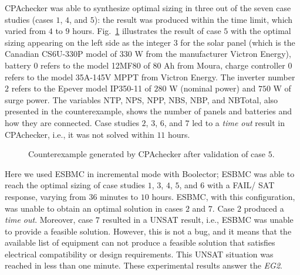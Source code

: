 \documentclass[runningheads]{llncs}
\begin{document}
CPAchecker was able to synthesize optimal sizing in three out of the seven case studies (cases $1$, $4$, and $5$): the result was produced within the time limit, which varied from $4$ to $9$ hours. 
Fig.~\ref{fig:CPAoptc1} illustrates the result of case $5$ with the optimal sizing appearing on the left side as the integer $3$ for the solar panel (which is the Canadian CS6U-330P model of $330$ W from the manufacturer Victron Energy), battery $0$ refers to the model 12MF80 of $80$ Ah from Moura, charge controller $0$ refers to the model 35A-145V MPPT from Victron Energy. The inverter number $2$ refers to the Epever model IP350-11 of $280$ W (nominal power) and $750$ W of surge power. The variables NTP, NPS, NPP, NBS, NBP, and NBTotal, also presented in the counterexample, shows the number of panels and batteries and how they are connected.
Case studies $2$, $3$, $6$, and $7$ led to a \textit{time out} result in CPAchecker, i.e., it was not solved within $11$ hours.  
%
\begin{figure}[h]
\centering
\caption{Counterexample generated by CPAchecker after validation of case $5$.}
\label{fig:CPAoptc1}
\end{figure}

Here we used ESBMC in incremental mode with Boolector; ESBMC was able to reach the optimal sizing of case studies $1$, $3$, $4$, $5$, and $6$ with a FAIL/ SAT response, varying from $36$ minutes to $10$ hours. ESBMC, with this configuration, was unable to obtain an optimal solution in cases $2$ and $7$. Case $2$ produced a \textit{time out}. Moreover, case $7$ resulted in a UNSAT result, i.e., ESBMC was unable to provide a feasible solution. However, this is not a bug, and it means that the available list of equipment can not produce a feasible solution that satisfies electrical compatibility or design requirements. This UNSAT situation was reached in less than one minute. These experimental results answer the \textit{EG2}.
\end{document}
